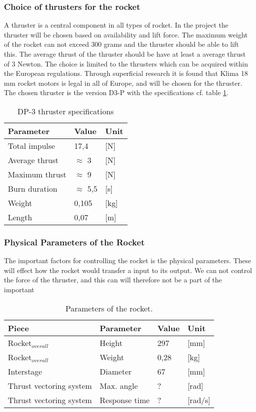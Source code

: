 \subsubsection*{Choice of thrusters for the rocket}
A thruster is a central component in all types of rocket. In the project the thruster will be chosen based on availability and lift force. The maximum weight of the rocket can not exceed 300 grams and the thruster should be able to lift this. The average thrust of the thruster should be have at least a average thrust of 3 Newton. The choice is limited to the thrusters which can be acquired within the European regulations. Through superficial research it is found that Klima 18 mm rocket motors is legal in all of Europe, and will be chosen for the thruster. The chosen thruster is the version D3-P with the specifications cf. table \ref{ThrusterValue}.

\begin{table}[]
\centering
\begin{tabular}{lll}
\hline
Parameter      & Value         & Unit \\ \hline
Total impulse  & 17,4          & [N]  \\
Average thrust & $\approx$ 3   & [N]  \\
Maximum thrust & $\approx$ 9 & [N]  \\
Burn duration  & $\approx$ 5,5 & [s]  \\
Weight         & 0,105         & [kg] \\
Length         & 0,07          & [m] 
\end{tabular}
\caption{DP-3 thruster specifications}
\label{ThrusterValue}
\end{table}
                

\subsubsection*{Physical Parameters of the Rocket}
The important factors for controlling the rocket is the physical parameters. These will effect how the rocket would transfer a input to its output. We can not control the force of the thruster, and this can will therefore not be a part of the important   		
\begin{table}[htbp]
	\centering
	\begin{tabular}{llll}
	\hline
	Piece & Parameter & Value & Unit \\ \hline
	Rocket$_{overall}$ & Height & 297 & {[}mm{]} \\
	Rocket$_{overall}$ & Weight & 0,28 & {[}kg{]} \\
	Interstage & Diameter & 67 & {[}mm{]} \\
	Thrust vectoring system & Max. angle & ? & {[}rad{]}\\
	Thrust vectoring system & Response time & ? & {[}rad/s{]}
	\end{tabular}
\caption{Parameters of the rocket.}
\label{Rocket_measurements}
\end{table}

